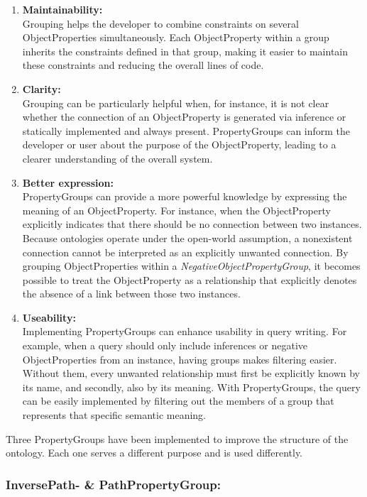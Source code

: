 \documentclass[
  a4paper,  %
  twoside,  %
  bibliography=totoc,
  headsepline,
  cleardoublepage=empty,
  parskip=half,
  draft=false
]{scrbook}
\begin{document}
\begin{enumerate}
    \item \textbf{Maintainability: }\\
    Grouping helps the developer to combine constraints on several ObjectProperties simultaneously. Each ObjectProperty within a group inherits the constraints defined in that group, making it easier to maintain these constraints and reducing the overall lines of code. 
    \item \textbf{Clarity: }\\
    Grouping can be particularly helpful when, for instance, it is not clear whether the connection of an ObjectProperty is generated via inference or statically implemented and always present. PropertyGroups can inform the developer or user about the purpose of the ObjectProperty, leading to a clearer understanding of the overall system.
    \item \textbf{Better expression: }\\
    PropertyGroups can provide a more powerful knowledge by expressing the meaning of an ObjectProperty. For instance, when the ObjectProperty explicitly indicates that there should be no connection between two instances. Because ontologies operate under the open-world assumption, a nonexistent connection cannot be interpreted as an explicitly unwanted connection. By grouping ObjectProperties within a \textit{NegativeObjectPropertyGroup}, it becomes possible to treat the ObjectProperty as a relationship that explicitly denotes the absence of a link between those two instances.
    \item \textbf{Useability: }\\
    Implementing PropertyGroups can enhance usability in query writing. For example, when a query should only include inferences or negative ObjectProperties from an instance, having groups makes filtering easier. Without them, every unwanted relationship must first be explicitly known by its name, and secondly, also by its meaning. With PropertyGroups, the query can be easily implemented by filtering out the members of a group that represents that specific semantic meaning.
\end{enumerate}

Three PropertyGroups have been implemented to improve the structure of the ontology. Each one serves a different purpose and is used differently. 

\subsubsection{InversePath- \& PathPropertyGroup:}
\end{document}
